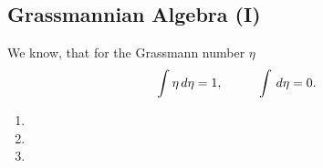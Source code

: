\subsection{Grassmannian Algebra (I)}

We know, that for the Grassmann number $\eta$
\begin{equation*}
	\int \eta \d \eta = 1,
	\hspace{10 mm} 
	\int \d \eta = 0.
\end{equation*}

\begin{enumerate}
	\item 
	\item 
	\item 
\end{enumerate}
